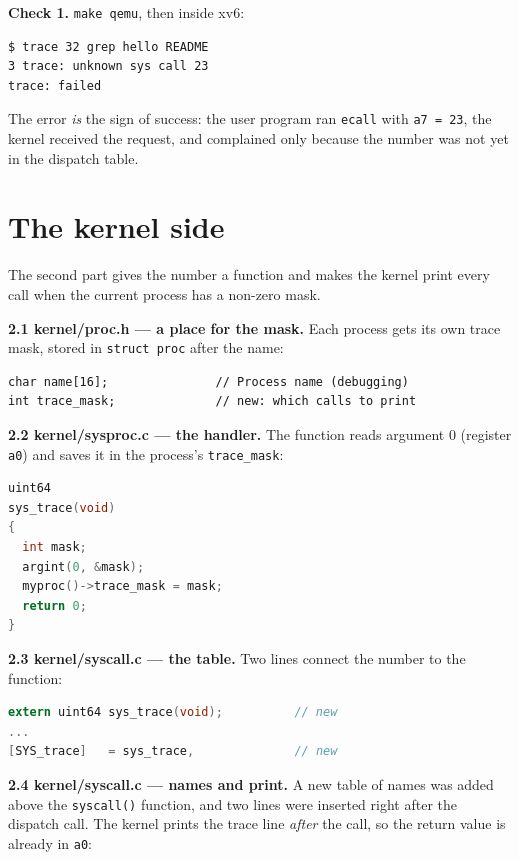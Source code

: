 \documentclass[12pt,a4paper]{article}
\begin{document}
\textbf{Check 1.} \texttt{make qemu}, then inside xv6:

\begin{lstlisting}
$ trace 32 grep hello README
3 trace: unknown sys call 23
trace: failed
\end{lstlisting}

The error \emph{is} the sign of success: the user program ran \texttt{ecall} with \texttt{a7 = 23}, the kernel received the request, and complained only because the number was not yet in the dispatch table.

\section{The kernel side}

The second part gives the number a function and makes the kernel print every call when the current process has a non-zero mask.

\textbf{2.1 kernel/proc.h --- a place for the mask.} Each process gets its own trace mask, stored in \texttt{struct proc} after the name:

\begin{lstlisting}
char name[16];               // Process name (debugging)
int trace_mask;              // new: which calls to print
\end{lstlisting}

\textbf{2.2 kernel/sysproc.c --- the handler.} The function reads argument 0 (register \texttt{a0}) and saves it in the process's \texttt{trace\_mask}:

\begin{lstlisting}[language=C]
uint64
sys_trace(void)
{
  int mask;
  argint(0, &mask);
  myproc()->trace_mask = mask;
  return 0;
}
\end{lstlisting}

\textbf{2.3 kernel/syscall.c --- the table.} Two lines connect the number to the function:

\begin{lstlisting}[language=C]
extern uint64 sys_trace(void);          // new
...
[SYS_trace]   = sys_trace,              // new
\end{lstlisting}

\textbf{2.4 kernel/syscall.c --- names and print.} A new table of names was added above the \texttt{syscall()} function, and two lines were inserted right after the dispatch call. The kernel prints the trace line \emph{after} the call, so the return value is already in \texttt{a0}:
\end{document}
